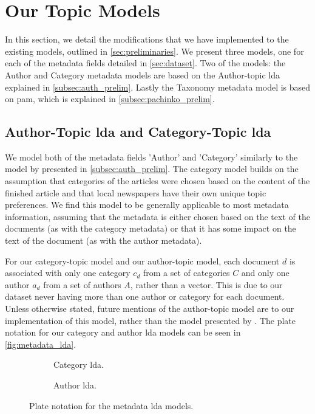 \section{Our Topic Models}\label{sec:plate_notation}
In this section, we detail the modifications that we have implemented to the existing models, outlined in \autoref{sec:preliminaries}.
We present three models, one for each of the metadata fields detailed in \autoref{sec:dataset}.
Two of the models: the Author and Category metadata models are based on the Author-topic \gls{lda} explained in \autoref{subsec:auth_prelim}.
Lastly the Taxonomy metadata model is based on \gls{pam}, which is explained in \autoref{subsec:pachinko_prelim}.

\subsection{Author-Topic \gls{lda} and Category-Topic \gls{lda}}
We model both of the metadata fields 'Author' and 'Category' similarly to the model by \citet{author_topic_2012} presented in \autoref{subsec:auth_prelim}.
The category model builds on the assumption that categories of the articles were chosen based on the content of the finished article and that local newspapers have their own unique topic preferences.
We find this model to be generally applicable to most metadata information, assuming that the metadata is either chosen based on the text of the documents (as with the category metadata) or that it has some impact on the text of the document (as with the author metadata).

For our category-topic model and our author-topic model, each document $d$ is associated with only one category $c_d$ from a set of categories $C$ and only one author $a_d$ from a set of authors $A$, rather than a vector.
This is due to our dataset never having more than one author or category for each document.
Unless otherwise stated, future mentions of the author-topic model are to our implementation of this model, rather than the model presented by \citet{author_topic_2012}.
The plate notation for our category and author \gls{lda} models can be seen in \autoref{fig:metadata_lda}.

\begin{figure}[ht]
	\centering
	\begin{subfigure}{0.425\columnwidth}
		\centering
		\resizebox{\textwidth}{!}{%
		
		}
		\caption{Category \gls{lda}.}
		\label{fig:category_lda}
	\end{subfigure}
	\hspace{2em}
	\begin{subfigure}{0.425\columnwidth}
		\centering
		\resizebox{\textwidth}{!}{%
			
		}
		\caption{Author \gls{lda}.}
		\label{fig:author_lda}
	\end{subfigure}
	\caption{Plate notation for the metadata \gls{lda} models.}
	\label{fig:metadata_lda}
\end{figure}

